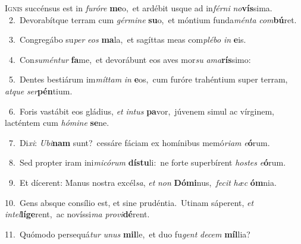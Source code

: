 \lettrine{\initial\textcolor{\initialcolor}{I}}{gnis} succénsus est in \textit{fu}\-\textit{ró}\textit{re} \textbf{me}\-o,~\star et ardébit usque ad in\-\textit{fér}\-\textit{ni} \textit{no}\-\textbf{vís}sima.\\
{\numbfont\textcolor{\numbcolor}{~2.}}~Devorabítque terram cum \textit{gér}\-\textit{mi}\textit{ne} \textbf{su}\-o,~\star et móntium funda\-\textit{mén}\-\textit{ta} \textit{com}\-\textbf{bú}ret.\par
{\numbfont\textcolor{\numbcolor}{~3.}}~Congregábo su\textit{per} \textit{e}\-\textit{os} \textbf{ma}\-la,~\star et sagíttas meas com\-\textit{plé}\-\textit{bo} \textit{in} \textbf{e}\-is.\par
{\numbfont\textcolor{\numbcolor}{~4.}}~Con\-\textit{su}\-\textit{mén}\textit{tur} \textbf{fa}\-me,~\star et devorábunt eos aves mor\textit{su} \textit{a}\-\textit{ma}\textbf{rís}simo:\par
{\numbfont\textcolor{\numbcolor}{~5.}}~Dentes bestiárum im\-\textit{mít}\-\textit{tam} \textit{in} \textbf{e}\-os,~\star cum furóre trahéntium super terram, \textit{at}\-\textit{que} \textit{ser}\-\textbf{pén}tium.\par
{\numbfont\textcolor{\numbcolor}{~6.}}~Foris vastábit eos gládius, \textit{et} \textit{in}\-\textit{tus} \textbf{pa}\-vor,~\star júvenem simul ac vírginem, lacténtem cum \textit{hó}\-\textit{mi}\textit{ne} \textbf{se}\-ne.\par
{\numbfont\textcolor{\numbcolor}{~7.}}~Di\-\textit{xi}\-: \textit{U}\-\textit{bi}\textbf{nam} sunt?~\star cessáre fáciam ex homínibus memó\-\textit{ri}\-\textit{am} \textit{e}\-\textbf{ó}rum.\par
{\numbfont\textcolor{\numbcolor}{~8.}}~Sed propter iram ini\-\textit{mi}\-\textit{có}\textit{rum} \textbf{dís}\-\textbf{tu}li:~\star ne forte superbírent \textit{hos}\-\textit{tes} \textit{e}\-\textbf{ó}rum.\par
{\numbfont\textcolor{\numbcolor}{~9.}}~Et dícerent: Manus nostra excél\-\textit{sa}\-, \textit{et} \textit{non} \textbf{Dó}\-\textbf{mi}nus,~\star \textit{fe}\-\textit{cit} \textit{hæc} \textbf{óm}\-nia.\par
{\numbfont\textcolor{\numbcolor}{10.}}~Gens absque consílio est, et sine prudéntia.~\dagger Utinam sáperent, \textit{et} \textit{in}\-\textit{tel}\textbf{lí}\textbf{ge}rent,~\star ac novíssi\textit{ma} \textit{pro}\-\textit{vi}\textbf{dé}rent.\par
{\numbfont\textcolor{\numbcolor}{11.}}~Quómodo persequá\textit{tur} \textit{u}\-\textit{nus} \textbf{mil}\-le,~\star et duo fu\textit{gent} \textit{de}\-\textit{cem} \textbf{míl}\-lia?\par
